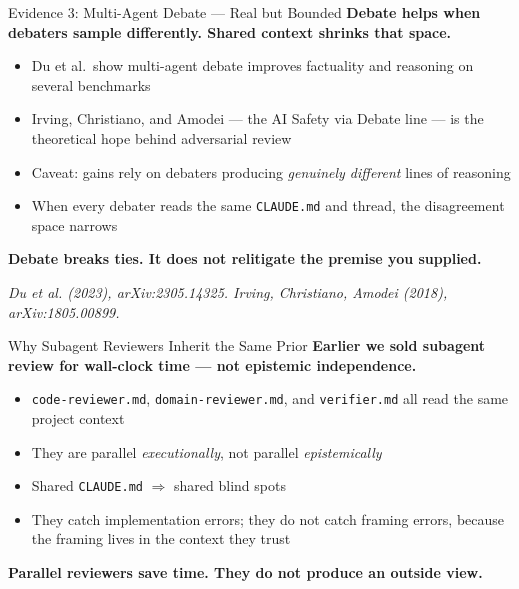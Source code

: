 \documentclass[10pt,english,aspectratio=169]{beamer}
\begin{document}
\begin{frame}{Evidence 3: Multi-Agent Debate --- Real but Bounded}
\textbf{Debate helps when debaters sample differently. Shared context shrinks that space.}

\vspace{0.2cm}

\begin{itemize}
    \item Du et al.\ show multi-agent debate improves factuality and reasoning on several benchmarks
    \item Irving, Christiano, and Amodei --- the AI Safety via Debate line --- is the theoretical hope behind adversarial review
    \item Caveat: gains rely on debaters producing \textit{genuinely different} lines of reasoning
    \item When every debater reads the same \texttt{CLAUDE.md} and thread, the disagreement space narrows
\end{itemize}

\vspace{0.2cm}

\textbf{Debate breaks ties. It does not relitigate the premise you supplied.}

\vspace{0.15cm}
{\scriptsize \textit{Du et al. (2023), arXiv:2305.14325. Irving, Christiano, Amodei (2018), arXiv:1805.00899.}}
\end{frame}

\begin{frame}{Why Subagent Reviewers Inherit the Same Prior}
\textbf{Earlier we sold subagent review for wall-clock time --- not epistemic independence.}

\vspace{0.25cm}

\begin{itemize}
    \item \texttt{code-reviewer.md}, \texttt{domain-reviewer.md}, and \texttt{verifier.md} all read the same project context
    \item They are parallel \textit{executionally}, not parallel \textit{epistemically}
    \item Shared \texttt{CLAUDE.md} $\Rightarrow$ shared blind spots
    \item They catch implementation errors; they do not catch framing errors, because the framing lives in the context they trust
\end{itemize}

\vspace{0.25cm}

\textbf{Parallel reviewers save time. They do not produce an outside view.}
\end{frame}
\end{document}
